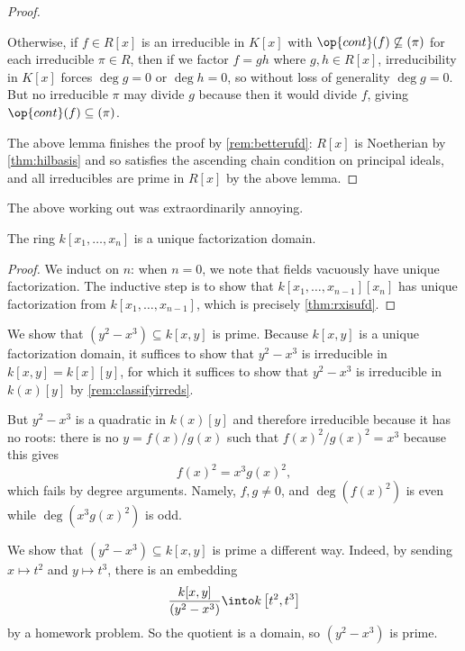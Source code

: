 \begin{proof}
\begin{remark}[Nir]
		Otherwise, if $f\in R[x]$ is an irreducible in $K[x]$ with $\op{cont}(f)\not\subseteq(\pi)$ for each irreducible $\pi\in R$, then if we factor $f=gh$ where $g,h\in R[x]$, irreducibility in $K[x]$ forces $\deg g=0$ or $\deg h=0$, so without loss of generality $\deg g=0$. But no irreducible $\pi$ may divide $g$ because then it would divide $f$, giving $\op{cont}(f)\subseteq(\pi)$.
	\end{remark}
	The above lemma finishes the proof by \autoref{rem:betterufd}: $R[x]$ is Noetherian by \autoref{thm:hilbasis} and so satisfies the ascending chain condition on principal ideals, and all irreducibles are prime in $R[x]$ by the above lemma.
\end{proof}
\begin{remark}[Nir]
	The above working out was extraordinarily annoying.
\end{remark}
\begin{corollary}
	The ring $k[x_1,\ldots,x_n]$ is a unique factorization domain.
\end{corollary}
\begin{proof}
	We induct on $n$: when $n=0$, we note that fields vacuously have unique factorization. The inductive step is to show that $k[x_1,\ldots,x_{n-1}][x_n]$ has unique factorization from $k[x_1,\ldots,x_{n-1}]$, which is precisely \autoref{thm:rxisufd}.
\end{proof}
\begin{example}
	We show that $\left(y^2-x^3\right)\subseteq k[x,y]$ is prime. Because $k[x,y]$ is a unique factorization domain, it suffices to show that $y^2-x^3$ is irreducible in $k[x,y]=k[x][y]$, for which it suffices to show that $y^2-x^3$ is irreducible in $k(x)[y]$ by \autoref{rem:classifyirreds}.
	
	But $y^2-x^3$ is a quadratic in $k(x)[y]$ and therefore irreducible because it has no roots: there is no $y=f(x)/g(x)$ such that $f(x)^2/g(x)^2=x^3$ because this gives
	\[f(x)^2=x^3g(x)^2,\]
	which fails by degree arguments. Namely, $f,g\ne0$, and $\deg\left(f(x)^2\right)$ is even while $\deg\left(x^3g(x)^2\right)$ is odd.
\end{example}
\begin{example}
	We show that $\left(y^2-x^3\right)\subseteq k[x,y]$ is prime a different way. Indeed, by sending $x\mapsto t^2$ and $y\mapsto t^3$, there is an embedding
	\[\frac{k[x,y]}{\left(y^2-x^3\right)}\into k\left[t^2,t^3\right]\]
	by a homework problem. So the quotient is a domain, so $\left(y^2-x^3\right)$ is prime.
\end{example}


